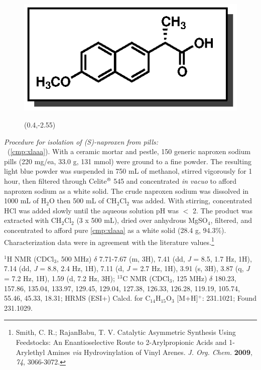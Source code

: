 \vspace{10pt}
\begin{figure}
  \vspace{-30pt}
  \begin{center}
    \includegraphics[scale=0.8]{chp_asymmetric/images/xlaaa}
           \begin{textblock}{1}(0.4,-2.55)  \end{textblock}
  \end{center}
  \vspace{-30pt}
\end{figure}
\noindent \textit{Procedure for isolation of (S)-naproxen from pills:}\\
\textbf{\CMPxlaaa}\ (\ref{cmp:xlaaa}).
With a ceramic mortar and pestle, 150 generic naproxen sodium pills (220 mg/ea, 33.0 g, 131 mmol) were ground to a
fine powder. The resulting light blue powder was suspended in 750 mL of methanol, stirred
vigorously for 1 hour, then filtered through
Celite$\textsuperscript{\textregistered}$ 545 and concentrated \textit{in vacuo}
to afford naproxen sodium as a white solid. The crude naproxen sodium was
dissolved in 1000 mL of H$_2$O then 500 mL of CH$_2$Cl$_2$ was added. With
stirring, concentrated HCl was added slowly until the aqueous solution pH was
$<$ 2. The product was extracted with CH$_2$Cl$_2$ (3 x 500 mL), dried over
anhydrous MgSO$_4$, filtered, and concentrated to afford pure \ref{cmp:xlaaa} as
a white solid (28.4 g, 94.3\%). Characterization data were in agreement with the
literature values.\footnote{{\frenchspacing Smith, C. R.; RajanBabu, T. V. Catalytic Asymmetric
Synthesis Using Feedstocks: An Enantioselective Route to 2-Arylpropionic Acids and 1-Arylethyl
Amines \textit{via} Hydrovinylation of Vinyl Arenes. \textit{J. Org. Chem.} \textbf{2009}, \textit{74}, 3066-3072.}}

\noindent $^1$H NMR (CDCl$_3$, 500 MHz) $\delta$ 7.71-7.67 (m, 3H), 7.41 (dd, \textit{J} = 8.5, 1.7 Hz, 1H), 7.14
(dd, \textit{J} = 8.8, 2.4 Hz, 1H), 7.11 (d, \textit{J} = 2.7 Hz, 1H), 3.91 (s, 3H),
3.87 (q, \textit{J} = 7.2 Hz, 1H), 1.59 (d, 7.2 Hz, 3H); $^{13}$C NMR (CDCl$_3$,
125 MHz) $\delta$ 180.23, 157.86, 135.04, 133.97, 129.45, 129.04, 127.38,
126.33, 126.28, 119.19, 105.74, 55.46, 45.33, 18.31; HRMS (ESI+) Calcd. for
C$_{14}$H$_{15}$O$_{3}$ [M+H]$^+$: 231.1021; Found 231.1029.

